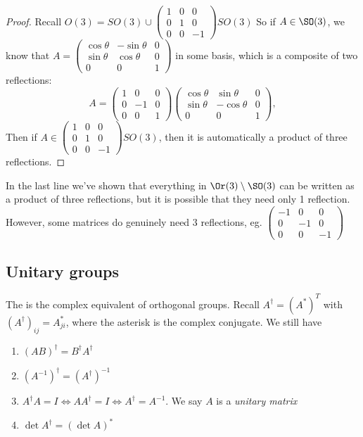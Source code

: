 \documentclass[a4paper]{article}
\begin{document}
\begin{proof}
  Recall $O(3) = SO(3) \cup
  \begin{pmatrix}
    1 & 0 & 0\\
    0 & 1 & 0\\
    0 & 0 & -1
  \end{pmatrix}SO(3)$
  So if $A\in \SO(3)$, we know that $A =
  \begin{pmatrix}
    \cos\theta & -\sin\theta & 0\\
    \sin\theta & \cos\theta & 0\\
    0 & 0 & 1
  \end{pmatrix}$ in some basis, which is a composite of two reflections:
  \[
    A =
    \begin{pmatrix}
      1 & 0 & 0\\
      0 & -1 & 0\\
      0 & 0 & 1
    \end{pmatrix}
    \begin{pmatrix}
      \cos\theta & \sin\theta & 0\\
      \sin\theta & -\cos\theta & 0\\
      0 & 0 & 1
    \end{pmatrix},
  \]
  Then if $A\in \begin{pmatrix}
    1 & 0 & 0\\
    0 & 1 & 0\\
    0 & 0 & -1
  \end{pmatrix}SO(3)$, then it is automatically a product of three reflections.
\end{proof}
\note In the last line we've shown that everything in $\Or(3)\setminus \SO(3)$ can be written as a product of three reflections, but it is possible that they need only 1 reflection. However, some matrices do genuinely need 3 reflections, eg.
$\begin{pmatrix}
  -1 & 0 & 0\\
  0 & -1 & 0\\
  0 & 0 & -1
\end{pmatrix}$

\subsection{Unitary groups}
The is the complex equivalent of orthogonal groups. Recall $A^\dagger = (A^*)^T$ with $(A^\dagger)_{ij} = A_{ji}^*$, where the asterisk is the complex conjugate. We still have
\begin{enumerate}
  \item $(AB)^\dagger = B^\dagger A^\dagger$
  \item $(A^{-1})^\dagger = (A^\dagger)^{-1}$
  \item $A^\dagger A = I \Leftrightarrow AA^\dagger = I \Leftrightarrow A^\dagger = A^{-1}$. We say $A$ is a \emph{unitary matrix}
  \item $\det A^{\dagger} = (\det A)^*$
\end{enumerate}
\end{document}
